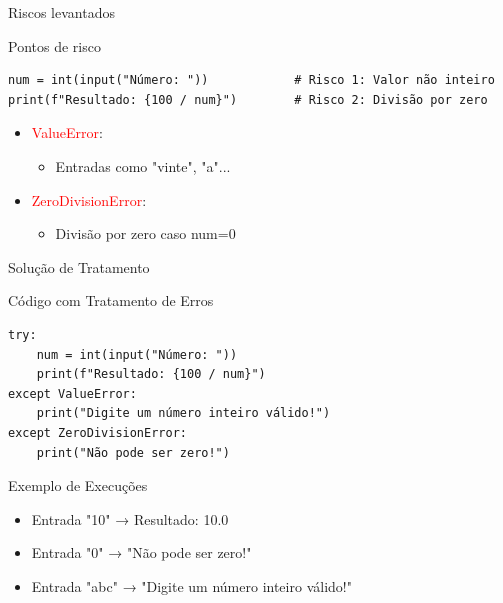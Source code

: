 \begin{frame}[fragile]{Riscos levantados}
    \begin{block}{Pontos de risco}
        \begin{verbatim}
num = int(input("Número: "))            # Risco 1: Valor não inteiro
print(f"Resultado: {100 / num}")        # Risco 2: Divisão por zero
\end{verbatim}
    \end{block}

    \begin{itemize}
        \item \textcolor{red}{ValueError}:
              \begin{itemize}
                  \item Entradas como "vinte", "a"...
              \end{itemize}

        \item \textcolor{red}{ZeroDivisionError}:
              \begin{itemize}
                  \item Divisão por zero caso num=0
              \end{itemize}
    \end{itemize}
\end{frame}

\begin{frame}[fragile]{Solução de Tratamento}
    \begin{block}{Código com Tratamento de Erros}
        \begin{verbatim}
try:
    num = int(input("Número: "))
    print(f"Resultado: {100 / num}")
except ValueError:
    print("Digite um número inteiro válido!")
except ZeroDivisionError:
    print("Não pode ser zero!")
\end{verbatim}
    \end{block}



    \begin{exampleblock}{Exemplo de Execuções}
        \begin{itemize}
            \item Entrada "10" → Resultado: 10.0
            \item Entrada "0" → "Não pode ser zero!"
            \item Entrada "abc" → "Digite um número inteiro válido!"
        \end{itemize}
    \end{exampleblock}
\end{frame}

